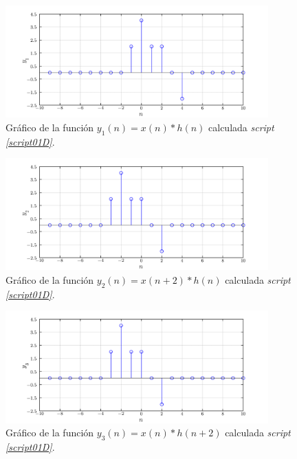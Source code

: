 \documentclass[a4paper,12pt,final]{article}
\begin{document}
      \begin{figure}[H]
        \caption{Gráfico de la función $y_1\left(n\right)=x\left(n\right)*h\left(n\right)$ calculada \emph{script \ref{script01D}}.}
        \label{script01Dfigure}
        \includegraphics[width=0.90\textwidth]{./laboratorio_3/problema01_y1.png}
      \end{figure}

      \begin{figure}[H]
        \caption{Gráfico de la función $y_2\left(n\right)=x\left(n+2\right)*h\left(n\right)$ calculada \emph{script \ref{script01D}}.}
        \label{script01Efigure}
        \includegraphics[width=0.90\textwidth]{./laboratorio_3/problema01_y2.png}
      \end{figure}

      \begin{figure}[H]
        \caption{Gráfico de la función $y_3\left(n\right)=x\left(n\right)*h\left(n+2\right)$ calculada \emph{script \ref{script01D}}.}
        \label{script01Ffigure}
        \includegraphics[width=0.90\textwidth]{./laboratorio_3/problema01_y3.png}
      \end{figure}
\end{document}
